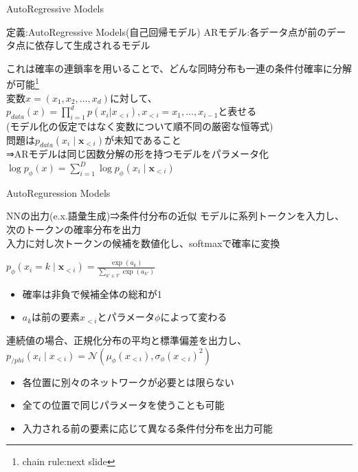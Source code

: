 \begin{frame}{AutoRegressive Models}
    \begin{block}{定義:AutoRegressive Models(自己回帰モデル)}
    ARモデル:各データ点が前のデータ点に依存して生成されるモデル\\
\end{block}
    これは確率の連鎖率を用いることで、どんな同時分布も一連の条件付確率に分解が可能\footnote{chain rule:next slide}\\
    変数$x=(x_1,x_2,\ldots,x_d)$に対して、$p_{data}(x)=\prod_{i=1}^d p(x_i|x_{<i}),x_{<i}=x_1,\ldots,x_{i-1}$と表せる\\
    (モデル化の仮定ではなく変数について順不同の厳密な恒等式)\\
    \vspace{1em}
    問題は$p_{data}(x_{i}\mid\boldsymbol{x}_{<i})$が未知であること\\
    ⇒ARモデルは同じ因数分解の形を持つモデルをパラメータ化\\
    $\log p_{\phi}(\mathit{x})=\sum_{i=1}^{D}\log p_{\phi}(x_{i}\mid\boldsymbol{x}_{<i})$
\end{frame}
\begin{frame}{AutoReguression Models}

    \begin{exampleblock}{NNの出力(e.x.語彙生成)⇒条件付分布の近似}
        モデルに系列トークンを入力し、次のトークンの確率分布を出力\\
        \vspace{1em}
        入力に対し次トークンの候補を数値化し、softmaxで確率に変換\\
        {\centering $p_{\phi}(x_{i}=k\mid\boldsymbol{x}_{<i})=\frac{\exp(a_{k})}{\sum_{k'\in \mathcal{V}}\exp(a_{k'})}$\par}
        \begin{itemize}
            \item 確率は非負で候補全体の総和が1
            \item $a_{k}$は前の要素$x_{<i}$とパラメータ$\phi$によって変わる
        \end{itemize}
        連続値の場合、正規化分布の平均と標準偏差を出力し、\\
        $p_{/phi}(x_{i}\mid x_{<i})=\mathcal{N}(\mu_{\phi}(x_{<i}),\sigma_{\phi}(x_{<i})^2)$
        \vspace{1em}
        \begin{itemize}
            \item 各位置に別々のネットワークが必要とは限らない
            \item 全ての位置で同じパラメータを使うことも可能
            \item 入力される前の要素に応じて異なる条件付分布を出力可能
        \end{itemize}
    \end{exampleblock}
\end{frame}
